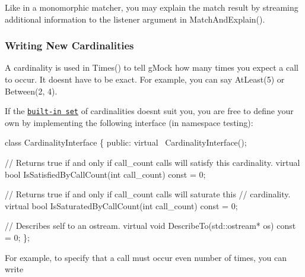 Like in a monomorphic matcher, you may explain the match result by streaming additional information to the {\ttfamily listener} argument in {\ttfamily Match\+And\+Explain()}.

\subsubsection*{Writing New Cardinalities}

A cardinality is used in {\ttfamily Times()} to tell g\+Mock how many times you expect a call to occur. It doesn\textquotesingle{}t have to be exact. For example, you can say {\ttfamily At\+Least(5)} or {\ttfamily Between(2, 4)}.

If the \href{gmock_cheat_sheet.md#CardinalityList}{\tt built-\/in set} of cardinalities doesn\textquotesingle{}t suit you, you are free to define your own by implementing the following interface (in namespace {\ttfamily testing})\+:


\begin{DoxyCode}
\textcolor{keyword}{class }CardinalityInterface \{
 \textcolor{keyword}{public}:
  \textcolor{keyword}{virtual} ~CardinalityInterface();

  \textcolor{comment}{// Returns true if and only if call\_count calls will satisfy this cardinality.}
  \textcolor{keyword}{virtual} \textcolor{keywordtype}{bool} IsSatisfiedByCallCount(\textcolor{keywordtype}{int} call\_count) \textcolor{keyword}{const} = 0;

  \textcolor{comment}{// Returns true if and only if call\_count calls will saturate this}
  \textcolor{comment}{// cardinality.}
  \textcolor{keyword}{virtual} \textcolor{keywordtype}{bool} IsSaturatedByCallCount(\textcolor{keywordtype}{int} call\_count) \textcolor{keyword}{const} = 0;

  \textcolor{comment}{// Describes self to an ostream.}
  \textcolor{keyword}{virtual} \textcolor{keywordtype}{void} DescribeTo(std::ostream* os) \textcolor{keyword}{const} = 0;
\};
\end{DoxyCode}


For example, to specify that a call must occur even number of times, you can write


